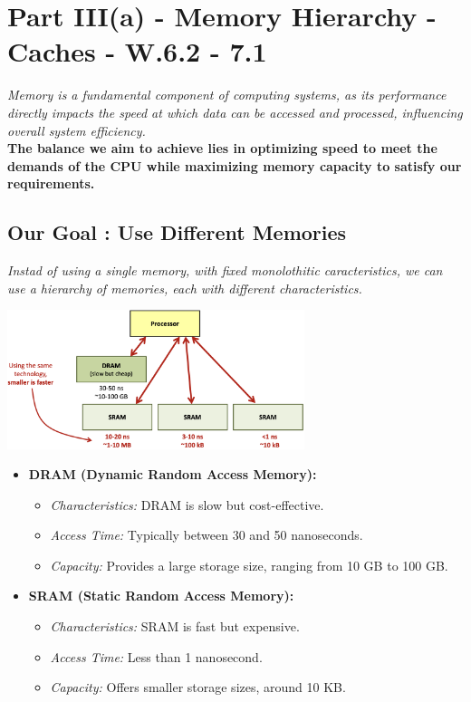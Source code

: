 \chapter{Part III(a) - Memory Hierarchy - Caches - W.6.2 - 7.1}
\textit{Memory is a fundamental component of computing systems, as its performance directly impacts the speed at which data can be accessed and processed, influencing overall system efficiency.} \\
\textbf{The balance we aim to achieve lies in optimizing speed to meet the demands of the CPU while maximizing memory capacity to satisfy our requirements.}
\section{Our Goal : Use Different Memories}
\textit{Instad of using a single memory, with fixed monolothitic caracteristics, we can use a hierarchy of memories, each with different characteristics.}
\begin{center}
    \includegraphics[width=0.65\textwidth]{chapters/chapter3a/images/hierarchy.png}
\end{center}
\begin{itemize}
    \item \textbf{DRAM (Dynamic Random Access Memory):}
    \begin{itemize}
        \item \textit{Characteristics:} DRAM is slow but cost-effective.
        \item \textit{Access Time:} Typically between 30 and 50 nanoseconds.
        \item \textit{Capacity:} Provides a large storage size, ranging from 10 GB to 100 GB.
    \end{itemize}
    
    \item \textbf{SRAM (Static Random Access Memory):}
    \begin{itemize}
        \item \textit{Characteristics:} SRAM is fast but expensive.
        \item \textit{Access Time:} Less than 1 nanosecond.
        \item \textit{Capacity:} Offers smaller storage sizes, around 10 KB.
    \end{itemize}
\end{itemize}

